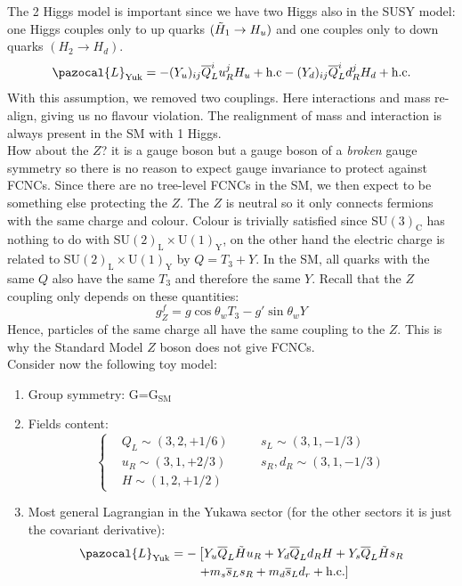 \documentclass[../main.tex]{subfiles}
\begin{document}
\newline
The 2 Higgs model is important since we have two Higgs also in the SUSY model: one Higgs couples only to up quarks $(\Tilde{H}_1\to H_u)$ and one couples only to down quarks $(H_2\to H_d)$.
\[
\pazocal{L}_{\text{Yuk}}=-(Y_u)_{ij}\overline{Q}_L^iu_R^jH_u+\text{h.c}-(Y_d)_{ij}\overline{Q}_L^id_R^jH_d+\text{h.c.}
\]
With this assumption, we removed two couplings. Here interactions and mass re-align, giving us no flavour violation. The realignment of mass and interaction is always present in the SM with 1 Higgs.\\
How about the $Z$? it is a gauge boson but a gauge boson of a \textit{broken} gauge symmetry so there is no reason to expect gauge invariance to protect against FCNCs. Since there are no tree-level FCNCs in the SM, we then expect to be something else protecting the $Z$. The $Z$ is neutral so it only connects fermions with the same charge and colour. Colour is trivially satisfied since SU$(3)_{\text{C}}$ has nothing to do with SU$(2)_{\text{L}}\times$U$(1)_{\text{Y}}$, on the other hand the electric charge is related to SU$(2)_{\text{L}}\times$U$(1)_{\text{Y}}$ by $Q=T_3+Y$. In the SM, all quarks with the same $Q$ also have the same $T_3$ and therefore the same $Y$. Recall that the $Z$ coupling only depends on these quantities:
\[
g_Z^f=g\cos\theta_wT_3-g'\sin\theta_wY
\]
Hence, particles of the same charge all have the same coupling to the $Z$. This is why the Standard Model $Z$ boson does not give FCNCs.\\
Consider now the following toy model:
\begin{enumerate}
    \item Group symmetry: G=G$_{\text{SM}}$
    \item Fields content: 
    \[
    \left\{
    \begin{aligned}
    &Q_L\sim(3,2,+1/6) \quad &&s_L\sim(3,1,-1/3)\\
    &u_R\sim(3,1,+2/3) \quad &&s_R,d_R\sim(3,1,-1/3)\\
    &H\sim(1,2,+1/2)
    \end{aligned}
    \right.
    \]
    \item Most general Lagrangian in the Yukawa sector (for the other sectors it is just the covariant derivative):
    \begin{align*}
    \pazocal{L}_{\text{Yuk}}=-&\left[Y_u\overline{Q}_L\Tilde{H}u_R+Y_d\overline{Q}_Ld_RH+Y_s\overline{Q}_L\Tilde{H}s_R\right.\\
    &\left.+m_s\overline{s}_Ls_R+m_d\overline{s}_Ld_r+\text{h.c.}\right]
    \end{align*}
\end{enumerate}
\end{document}

